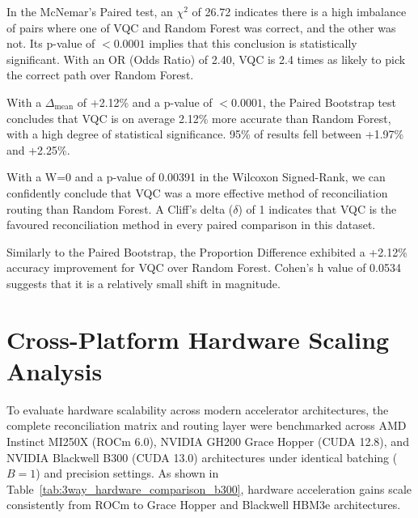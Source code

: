 \documentclass[journal]{IEEEtran}
\begin{document}
In the McNemar's Paired test, an $\chi^2$ of 26.72 indicates there is a high imbalance of pairs where one of VQC and Random Forest was correct, and the other was not. Its p-value of $<0.0001$ implies that this conclusion is statistically significant. With an OR (Odds Ratio) of 2.40, VQC is 2.4 times as likely to pick the correct path over Random Forest.

With a $\Delta_{\text{mean}}$ of +2.12\% and a p-value of $<0.0001$, the Paired Bootstrap test concludes that VQC is on average 2.12\% more accurate than Random Forest, with a high degree of statistical significance. 95\% of results fell between +1.97\% and +2.25\%.

With a W=0 and a p-value of 0.00391 in the Wilcoxon Signed-Rank, we can confidently conclude that VQC was a more effective method of reconciliation routing than Random Forest. A Cliff's delta ($\delta$) of 1 indicates that VQC is the favoured reconciliation method in every paired comparison in this dataset.

Similarly to the Paired Bootstrap, the Proportion Difference exhibited a +2.12\% accuracy improvement for VQC over Random Forest. Cohen's h value of 0.0534 suggests that it is a relatively small shift in magnitude.


\section{Cross-Platform Hardware Scaling Analysis}
To evaluate hardware scalability across modern accelerator architectures, the complete reconciliation matrix and routing layer were benchmarked across AMD Instinct MI250X (ROCm 6.0), NVIDIA GH200 Grace Hopper (CUDA 12.8), and NVIDIA Blackwell B300 (CUDA 13.0) architectures under identical batching ($B=1$) and precision settings. As shown in Table~\ref{tab:3way_hardware_comparison_b300}, hardware acceleration gains scale consistently from ROCm to Grace Hopper and Blackwell HBM3e architectures.
\end{document}
